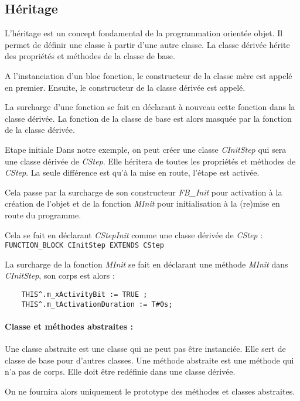 \subsection{Héritage}
L'héritage est un concept fondamental de la programmation orientée objet. Il permet de définir une classe à partir d'une autre classe. La classe dérivée hérite des propriétés et méthodes de la classe de base.

A l'instanciation d'un bloc fonction, le constructeur de la classe mère est appelé en premier. Ensuite, le constructeur de la classe dérivée est appelé.

La surcharge d'une fonction se fait en déclarant à nouveau cette fonction dans la classe dérivée. La fonction de la classe de base est alors masquée par la fonction de la classe dérivée.

\begin{UPSTIidee}{Etape initiale}
    Dans notre exemple, on peut créer une classe \emph{CInitStep} qui sera une classe dérivée de \emph{CStep}. Elle héritera de toutes les propriétés et méthodes de \emph{CStep}. La seule différence est qu'à la mise en route, l'étape est activée.

    Cela passe par la surcharge de son constructeur \emph{FB\_Init} pour activation à la création de l'objet et de la fonction \emph{MInit} pour initialisation à la (re)mise en route du programme.

    Cela se fait en déclarant \emph{CStepInit} comme une classe dérivée de \emph{CStep} : \lstinline{FUNCTION_BLOCK CInitStep EXTENDS CStep}

    La surcharge de la fonction \emph{MInit} se fait en déclarant une méthode \emph{MInit} dans \emph{CInitStep}, son corps est alors : 
    \begin{lstlisting}
    THIS^.m_xActivityBit := TRUE ;
    THIS^.m_tActivationDuration := T#0s;
    \end{lstlisting}
\end{UPSTIidee}

\paragraph{Classe et méthodes abstraites :} Une classe abstraite est une classe qui ne peut pas être instanciée. Elle sert de classe de base pour d'autres classes. Une méthode abstraite est une méthode qui n'a pas de corps. Elle doit être redéfinie dans une classe dérivée.

On ne fournira alors uniquement le prototype des méthodes et classes abstraites. 

